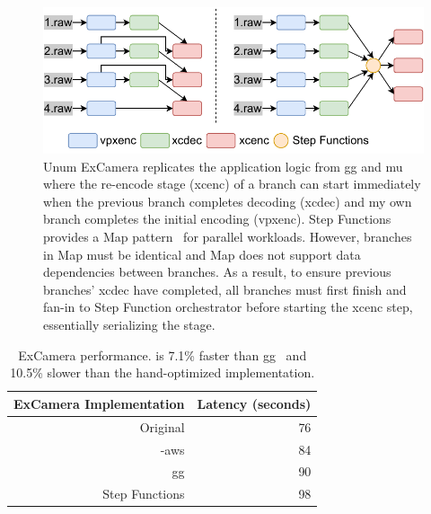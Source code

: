 \begin{figure}[t!]
    \centering
    \includegraphics[width=\columnwidth]{figures/ExCameraPattern.pdf}
    \caption{Unum ExCamera replicates the application logic from gg and mu
     where the re-encode stage (xcenc) of a branch can start immediately when
     the previous branch completes decoding (xcdec) and my own branch
     completes the initial encoding (vpxenc). Step Functions provides a Map
     pattern~\cite{aws-step-functions-map-state} for parallel workloads.
     However, branches in Map must be identical and Map does not support data
     dependencies between branches. As a result, to ensure previous branches'
     xcdec have completed, all branches must first finish and fan-in to Step
     Function orchestrator before starting the xcenc step, essentially
     serializing the stage.}
    \label{fig:excamera-pattern}
\end{figure}

\begin{table}
  \centering
  \begin{tabular}{|r|r|}
    \hline
    \textbf{ExCamera Implementation} & \textbf{Latency (seconds)} \\ \hline
    Original        & 76                         \\ \hline
    \name{}-aws & 84                         \\ \hline
    gg                       & 90                         \\ \hline
    Step Functions & 98                         \\ \hline
  \end{tabular}
  \caption{ExCamera performance. \name{} is 7.1\% faster than
gg~\cite{gg-atc} and 10.5\% slower than the hand-optimized implementation.}
  \label{table:excamera}
\end{table}


